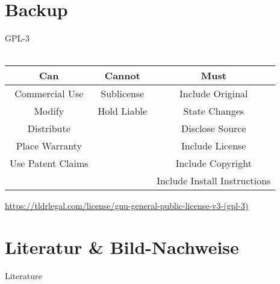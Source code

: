 \section{Backup}




\begin{frame}{GPL-3}
	\\
	\\
	\begin{tabular}{|c|c|c|}
		\hline 
		Can & Cannot & Must \\ 
		\hline 
		Commercial Use & Sublicense & Include Original \\ 
		\hline 
		Modify & Hold Liable & State Changes \\ 
		\hline 
		Distribute &  & Disclose Source \\ 
		\hline 
		Place Warranty &  & Include License \\ 
		\hline 
		Use Patent Claims &  & Include Copyright \\ 
		\hline 
		&  & Include Install Instructions \\ 
		\hline 
	\end{tabular} 
\end{frame}
\note
{
	\url{https://tldrlegal.com/license/gnu-general-public-license-v3-(gpl-3)}
}


\section{Literatur \& Bild-Nachweise}
\begin{frame}[allowframebreaks]{Literature}
	\tiny{
		
	}
\end{frame}
